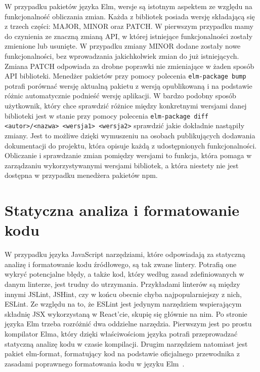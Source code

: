 W przypadku pakietów języka Elm, wersje są istotnym aspektem ze względu na funkcjonalność obliczania zmian. Każda z bibliotek posiada wersję składającą się z trzech części: MAJOR, MINOR oraz PATCH. W pierwszym przypadku mamy do czynienia ze znaczną zmianą API, w której istniejące funkcjonalności zostały zmienione lub usunięte. W przypadku zmiany MINOR dodane zostały nowe funkcjonalności, bez wprowadzania jakichkolwiek zmian do już istniejących. Zmiana PATCH odpowiada za drobne poprawki nie zmieniające w żaden sposób API biblioteki. Menedżer pakietów przy pomocy polecenia \lstinline{elm-package bump} potrafi porównać wersję aktualną pakietu z wersją opublikowaną i na podstawie różnic automatycznie podnieść wersję aplikacji. W bardzo podobny sposób użytkownik, który chce sprawdzić różnice między konkretnymi wersjami danej biblioteki jest w stanie przy pomocy polecenia \lstinline{elm-package diff <autor>/<nazwa> <wersja1> <wersja2>} sprawdzić jakie dokładnie nastąpiły zmiany. Jest to możliwe dzięki wymuszeniu na osobach publikujących dodawania dokumentacji do projektu, która opisuje każdą z udostępnionych funkcjonalności. Obliczanie i sprawdzanie zmian pomiędzy wersjami to funkcja, która pomaga w zarządzaniu wykorzystywanymi wersjami bibliotek, a która niestety nie jest dostępna w przypadku menedżera pakietów npm.

\section{Statyczna analiza i formatowanie kodu}
W przypadku języka JavaScript narzędziami, które odpowiadają za statyczną analizę i formatowanie kodu źródłowego, są tak zwane lintery. Potrafią one wykryć potencjalne błędy, a także kod, który według zasad zdefiniowanych w danym linterze, jest trudny do utrzymania. Przykładami linterów są między innymi JSLint, JSHint, czy w końcu obecnie chyba najpopularniejszy z nich, ESLint. Ze względu na to, że ESLint jest jedynym narzędziem wspierającym składnię JSX wykorzystaną w React'cie, skupię się głównie na nim. Po stronie języka Elm trzeba rozróżnić dwa oddzielne narzędzia. Pierwszym jest po prostu kompilator Elma, który dzięki właściwościom języka potrafi przeprowadzać statyczną analizę kodu w czasie kompilacji. Drugim narzędziem natomiast jest pakiet elm-format, formatujący kod na podstawie oficjalnego przewodnika z zasadami poprawnego formatowania kodu w języku Elm~\cite{elmStyleGuide}. 

